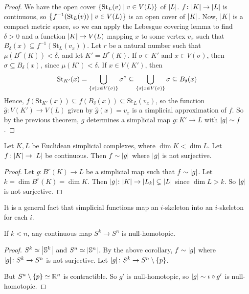 \begin{proof}
	We have the open cover \( \qty{\mathrm{St}_L(v) \mid v \in V(L)} \) of \( \abs{L} \).
	\( f \colon \abs{K} \to \abs{L} \) is continuous, so \( \qty{f^{-1}(\mathrm{St}_L(v)) \mid v \in V(L)} \) is an open cover of \( \abs{K} \).
	Now, \( \abs{K} \) is a compact metric space, so we can apply the Lebesgue covering lemma to find \( \delta > 0 \) and a function \( \abs{K} \to V(L) \) mapping \( x \) to some vertex \( v_x \) such that \( B_\delta(x) \subseteq f^{-1}(\mathrm{St}_L(v_x)) \).
	Let \( r \) be a natural number such that \( \mu(B^r(K)) < \delta \), and let \( K' = B^r(K) \).
	If \( \sigma \in K' \) and \( x \in V(\sigma) \), then \( \sigma \subseteq B_\delta(x) \), since \( \mu(K') < \delta \).
	If \( x \in V(K') \), then
	\[ \mathrm{St}_{K'}(x) = \bigcup_{\qty{\sigma \mid x \in V(\sigma)}} \sigma^\circ \subseteq \bigcup_{\qty{\sigma \mid x \in V(\sigma)}} \sigma \subseteq B_\delta(x) \]
	Hence, \( f(\mathrm{St}_{K'}(x)) \subseteq f(B_\delta(x)) \subseteq \mathrm{St}_L(v_x) \), so the function \( \hat g \colon V(K') \to V(L) \) given by \( \hat g(x) = v_x \) is a simplicial approximation of \( f \).
	So by the previous theorem, \( \hat g \) determines a simplicial map \( g \colon K' \to L \) with \( \abs{g} \sim f \).
\end{proof}
\begin{corollary}
	Let \( K, L \) be Euclidean simplicial complexes, where \( \dim K < \dim L \).
	Let \( f \colon \abs{K} \to \abs{L} \) be continuous.
	Then \( f \sim \abs{g} \) where \( \abs{g} \) is not surjective.
\end{corollary}
\begin{proof}
	Let \( g \colon B^r(K) \to L \) be a simplicial map such that \( f \sim \abs{g} \).
	Let \( k = \dim B^r(K) = \dim K \).
	Then \( \abs{g} \colon \abs{K} \to \abs{L_k} \subsetneq \abs{L} \) since \( \dim L > k \).
	So \( \abs{g} \) is not surjective.
\end{proof}
\begin{remark}
	It is a general fact that simplicial functions map an \( i \)-skeleton into an \( i \)-skeleton for each \( i \).
\end{remark}
\begin{theorem}
	If \( k < n \), any continuous map \( S^k \to S^n \) is null-homotopic.
\end{theorem}
\begin{proof}
	\( S^k \simeq \abs{\mathbb S^k} \) and \( S^n \simeq \abs{\mathbb S^n} \).
	By the above corollary, \( f \sim \abs{g} \) where \( \abs{g} \colon S^k \to S^n \) is not surjective.
	Let \( \abs{g} \colon S^k \to S^n \setminus \qty{p} \).
	\begin{center}
	\end{center}
	But \( S^n \setminus \qty{p} \simeq \mathbb R^n \) is contractible.
	So \( g' \) is null-homotopic, so \( \abs{g} \sim \iota \circ g' \) is null-homotopic.
\end{proof}

